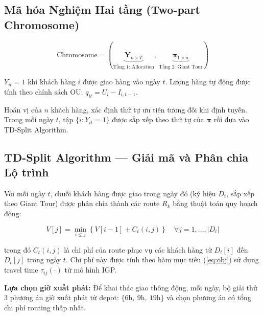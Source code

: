 \documentclass[12pt,a4paper]{article}
\newcommand{\boldterm}[1]{\textbf{\color{primary}#1}}
\newcommand{\tij}{\tau_{ij}}
\begin{document}
\subsection{Mã hóa Nghiệm Hai tầng (Two-part Chromosome)}

\begin{equation}
  \text{Chromosome} = \left(\underbrace{\mathbf{Y}_{n \times T}}_{\text{Tầng 1: Allocation}},\ 
                             \underbrace{\boldsymbol{\pi}_{1 \times n}}_{\text{Tầng 2: Giant Tour}}\right)
\end{equation}

\begin{description}[leftmargin=0cm]
  \item[\textbf{Tầng 1 --- Allocation Matrix} $\mathbf{Y} \in \{0,1\}^{n \times T}$:]
    $Y_{it} = 1$ khi khách hàng $i$ được giao hàng vào ngày $t$.
    Lượng hàng tự động được tính theo chính sách OU: $q_{it} = U_i - I_{i,t-1}$.

  \item[\textbf{Tầng 2 --- Giant Tour} $\boldsymbol{\pi}$:]
    Hoán vị của $n$ khách hàng, xác định thứ tự ưu tiên tương đối khi định tuyến.
    Trong mỗi ngày $t$, tập $\{i : Y_{it} = 1\}$ được sắp xếp theo thứ tự của
    $\boldsymbol{\pi}$ rồi đưa vào TD-Split Algorithm.
\end{description}

\subsection{TD-Split Algorithm --- Giải mã và Phân chia Lộ trình}

Với mỗi ngày $t$, chuỗi khách hàng được giao trong ngày đó (ký hiệu $D_t$, sắp xếp
theo Giant Tour) được phân chia thành các route $R_k$ bằng thuật toán quy hoạch động:

\begin{equation}
  V[j] = \min_{i \leq j} \left\{ V[i-1] + C_t(i, j) \right\}
  \quad \forall j = 1, \ldots, |D_t|
\end{equation}

\noindent trong đó $C_t(i,j)$ là chi phí của route phục vụ các khách hàng từ $D_t[i]$
đến $D_t[j]$ trong ngày $t$. Chi phí này được tính theo hàm mục tiêu (\ref{eq:obj})
sử dụng travel time $\tij(\cdot)$ từ mô hình IGP.

\boldterm{Lựa chọn giờ xuất phát:} Để khai thác giao thông động, mỗi ngày, bộ giải thử
3 phương án giờ xuất phát từ depot: $\{6\text{h},\ 9\text{h},\ 19\text{h}\}$ và chọn
phương án có tổng chi phí routing thấp nhất.
\end{document}
